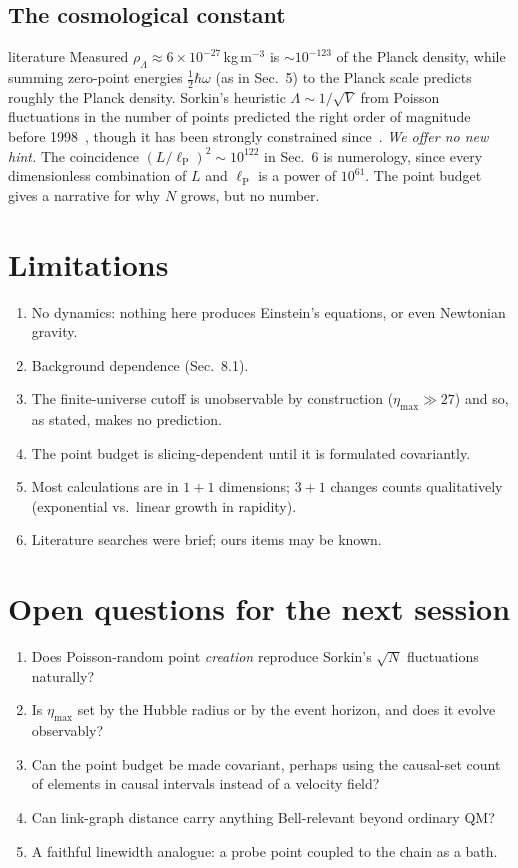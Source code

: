 \documentclass[11pt,a4paper]{article}
\newcommand{\tagbox}[2]{\textsf{\scriptsize\colorbox{#1!12}{\textcolor{#1!70!black}{#2}}}}
\newcommand{\lit}{\tagbox{blue}{literature}}
\newcommand{\ours}{\tagbox{orange}{ours}}
\newcommand{\lP}{\ell_{\mathrm P}}
\begin{document}
\subsection{The cosmological constant}
\lit{} Measured $\rho_\Lambda\approx6\times10^{-27}$\,kg\,m$^{-3}$ is $\sim10^{-123}$ of the Planck density, while summing zero-point energies $\tfrac12\hbar\omega$ (as in Sec.~5) to the Planck scale predicts roughly the Planck density. Sorkin's heuristic $\Lambda\sim1/\sqrt V$ from Poisson fluctuations in the number of points predicted the right order of magnitude before 1998~\cite{Surya19,ADGS04}, though it has been strongly constrained since~\cite{Barrow06,DNY23}. \emph{We offer no new hint.} The coincidence $(L/\lP)^2\sim10^{122}$ in Sec.~6 is numerology, since every dimensionless combination of $L$ and $\lP$ is a power of $10^{61}$. The point budget gives a narrative for why $N$ grows, but no number.

\section{Limitations}
\begin{enumerate}[leftmargin=*,itemsep=1pt]
\item No dynamics: nothing here produces Einstein's equations, or even Newtonian gravity.
\item Background dependence (Sec.~8.1).
\item The finite-universe cutoff is unobservable by construction ($\eta_{\max}\gg27$) and so, as stated, makes no prediction.
\item The point budget is slicing-dependent until it is formulated covariantly.
\item Most calculations are in $1+1$ dimensions; $3+1$ changes counts qualitatively (exponential vs.\ linear growth in rapidity).
\item Literature searches were brief; \ours{} items may be known.
\end{enumerate}

\section{Open questions for the next session}
\begin{enumerate}[leftmargin=*,itemsep=1pt]
\item Does Poisson-random point \emph{creation} reproduce Sorkin's $\sqrt N$ fluctuations naturally?
\item Is $\eta_{\max}$ set by the Hubble radius or by the event horizon, and does it evolve observably?
\item Can the point budget be made covariant, perhaps using the causal-set count of elements in causal intervals instead of a velocity field?
\item Can link-graph distance carry anything Bell-relevant beyond ordinary QM?
\item A faithful linewidth analogue: a probe point coupled to the chain as a bath.
\end{enumerate}
\end{document}
